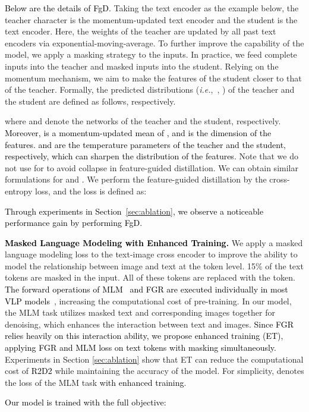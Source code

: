 \documentclass[sigconf]{acmart}
\def\ie{\mbox{\textit{i.e.}, }}
\def\xie{\textcolor{black}}
\def\blue{\textcolor{black}}
\def\mmxie{\textcolor{black}}
\def\mmljc{\textcolor{black}}
\def\mmcr{\textcolor{black}}
\begin{document}
\mmljc{Below are the details of FgD.}
Taking the text encoder as the example below, the teacher character is the momentum-updated text encoder and the student is the text encoder. Here, the weights of the teacher are updated by all past text encoders via exponential-moving-average. 
To further improve the capability of the model, we apply a masking strategy to the inputs. In practice, we feed complete inputs into the teacher and masked inputs into the student. 
Relying on the momentum mechanism, we aim to make the features of the student closer to that of the teacher.
Formally, the predicted distributions (\ie , ) of the teacher and the student are defined as follows, 
respectively.

where  and  denote the networks of the teacher and the student, respectively. \xie{Moreover,  is a momentum-updated mean of , and  is the dimension of the features.  and  are the temperature parameters of the teacher and the student, respectively, which can
sharpen the distribution of the features.}
Note that we do not use  for  to avoid collapse in feature-guided distillation. We can obtain similar formulations for  and . We perform the feature-guided distillation by the cross-entropy loss, and the loss  is defined as:

\mmxie{Through experiments in Section~\ref{sec:ablation}, we observe
a noticeable performance gain by performing FgD.}





\textbf{\blue{Masked Language Modeling with Enhanced Training}.}
We apply a masked language modeling loss to the text-image cross encoder to improve the ability to model the relationship between image and text at the token level. 15\% of the text tokens are masked in the input. All of these tokens are replaced with the  token.
\mmxie{The forward operations of MLM~\cite{bert} and \mmcr{FGR} are executed individually in most VLP models~\cite{uniter,ALBEF,FLAVA}}, increasing the computational cost of pre-training. In our model, the MLM task utilizes masked text and corresponding images together for denoising, which enhances the interaction between text and images. \mmxie{Since \mmcr{FGR} relies heavily on this interaction ability, we propose enhanced training (ET), applying \mmcr{FGR} and MLM loss on text tokens with masking simultaneously.}
Experiments in Section \ref{sec:ablation} show that ET can reduce the computational cost of \mmcr{R2D2} while maintaining the accuracy of the model. For simplicity,  denotes the loss of the MLM task \blue{with enhanced training}.
\mmxie{Our model is trained with the full objective:

}
\end{document}
